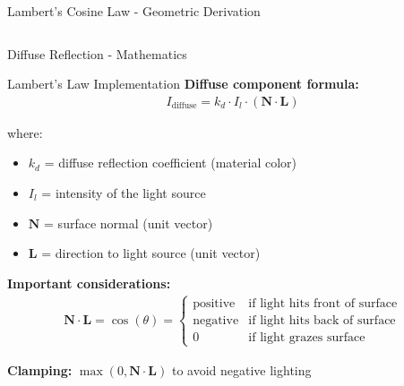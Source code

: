 \begin{frame}{Lambert's Cosine Law - Geometric Derivation}
\begin{columns}
\begin{column}{0.4\textwidth}
    \end{column}
  \end{columns}
\end{frame}

\begin{frame}{Diffuse Reflection - Mathematics}
  \begin{mathbox}{Lambert's Law Implementation}
    \textbf{Diffuse component formula:}
    \begin{align}
      I_{\text{diffuse}} = k_d \cdot I_l \cdot (\mathbf{N} \cdot \mathbf{L})
    \end{align}

    where:
    \begin{itemize}
      \item $k_d$ = diffuse reflection coefficient (material color)
      \item $I_l$ = intensity of the light source
      \item $\mathbf{N}$ = surface normal (unit vector)
      \item $\mathbf{L}$ = direction to light source (unit vector)
    \end{itemize}

    \vspace{0.3cm}
    \pause
    \textbf{Important considerations:}
    \begin{align}
      \mathbf{N} \cdot \mathbf{L} = \cos(\theta) =
      \begin{cases}
        \text{positive} & \text{if light hits front of surface} \\
        \text{negative} & \text{if light hits back of surface} \\
        0 & \text{if light grazes surface}
      \end{cases}
    \end{align}

    \pause
    \textbf{Clamping:} $\max(0, \mathbf{N} \cdot \mathbf{L})$ to avoid negative lighting
  \end{mathbox}
\end{frame}

